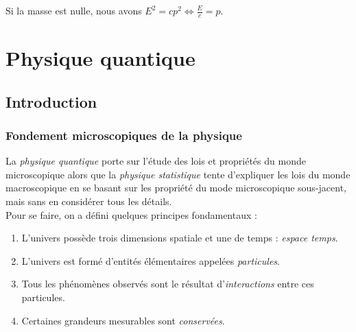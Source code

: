 \documentclass	[11pt, a4paper, openany]{book}
\begin{document}
Si la masse est nulle, nous avons $E^2 = cp^2 \Leftrightarrow \frac{E}{c} = p$.

\part{Physique quantique}
\chapter{Introduction}
\section{Fondement microscopiques de la physique}
La \textit{physique quantique} porte sur l'étude des lois et propriétés du monde microscopique alors que la \textit{physique statistique} tente d'expliquer les lois du monde macroscopique en se basant sur les propriété du mode microscopique sous-jacent, mais sans en considérer tous les détails.\\
Pour se faire, on a défini quelques principes fondamentaux :
\begin{enumerate}
\item L'univers possède trois dimensions spatiale et une de temps : \textit{espace temps}.
\item L'univers est formé d'entités élémentaires appelées \textit{particules}.
\item Tous les phénomènes observés sont le résultat d'\textit{interactions} entre ces particules.
\item Certaines grandeurs mesurables sont \textit{conservées}.
\end{enumerate}
\end{document}
